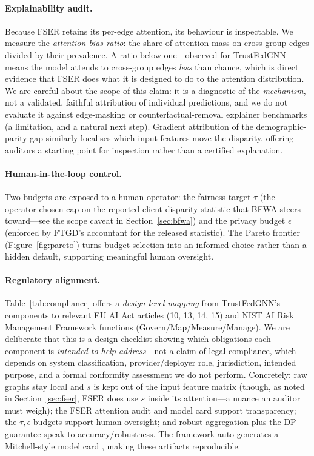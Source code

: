 \documentclass[pdflatex,sn-mathphys-num]{sn-jnl}
\theoremstyle{thmstyleone}%
\theoremstyle{thmstyletwo}%
\theoremstyle{thmstylethree}%
\begin{document}


\paragraph{Explainability audit.}
Because FSER retains its per-edge attention, its behaviour is inspectable. We
measure the \emph{attention bias ratio}: the share of attention mass on
cross-group edges divided by their prevalence. A ratio below one---observed for
TrustFedGNN---means the model attends to cross-group edges \emph{less} than
chance, which is direct evidence that FSER does what it is designed to do to the
attention distribution. We are careful about the scope of this claim: it is a
diagnostic of the \emph{mechanism}, not a validated, faithful attribution of
individual predictions, and we do not evaluate it against edge-masking or
counterfactual-removal explainer benchmarks (a limitation, and a natural next
step). Gradient attribution of the demographic-parity gap similarly localises
which input features move the disparity, offering auditors a starting point for
inspection rather than a certified explanation.

\paragraph{Human-in-the-loop control.}
Two budgets are exposed to a human operator: the fairness target $\tau$ (the
operator-chosen cap on the reported client-disparity statistic that BFWA steers
toward---see the scope caveat in Section~\ref{sec:bfwa}) and the privacy budget
$\epsilon$ (enforced by FTGD's accountant for the released statistic). The Pareto
frontier (Figure~\ref{fig:pareto}) turns budget selection into an informed choice
rather than a hidden default, supporting meaningful human oversight.

\paragraph{Regulatory alignment.}
Table~\ref{tab:compliance} offers a \emph{design-level mapping} from
TrustFedGNN's components to relevant EU AI Act articles (10, 13, 14, 15) and NIST
AI Risk Management Framework functions (Govern/Map/Measure/Manage). We are
deliberate that this is a design checklist showing which obligations each
component is \emph{intended to help address}---not a claim of legal compliance,
which depends on system classification, provider/deployer role, jurisdiction,
intended purpose, and a formal conformity assessment we do not perform. Concretely:
raw graphs stay local and $s$ is kept out of the input feature matrix (though, as
noted in Section~\ref{sec:fser}, FSER does use $s$ inside its attention---a
nuance an auditor must weigh); the FSER attention audit and model card support
transparency; the $\tau,\epsilon$ budgets support human oversight; and robust
aggregation plus the DP guarantee speak to accuracy/robustness. The framework
auto-generates a Mitchell-style model card \cite{mitchell2019model}, making these
artifacts reproducible.
\end{document}
